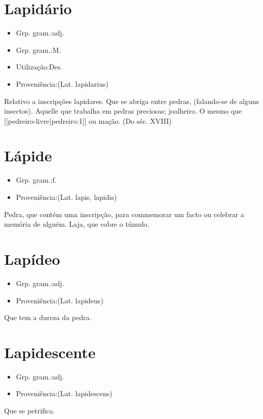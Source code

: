\section{Lapidário}
\begin{itemize}
\item {Grp. gram.:adj.}
\end{itemize}
\begin{itemize}
\item {Grp. gram.:M.}
\end{itemize}
\begin{itemize}
\item {Utilização:Des.}
\end{itemize}
\begin{itemize}
\item {Proveniência:(Lat. \textunderscore lapidarius\textunderscore )}
\end{itemize}
Relativo a inscripções lapidares.
Que se abriga entre pedras, (falando-se de alguns insectos).
Aquelle que trabalha em pedras preciosas; joalheiro.
O mesmo que [[pedreiro-livre|pedreiro:1]] ou \textunderscore mação\textunderscore . (Do séc. XVIII)
\section{Lápide}
\begin{itemize}
\item {Grp. gram.:f.}
\end{itemize}
\begin{itemize}
\item {Proveniência:(Lat. \textunderscore lapis\textunderscore , \textunderscore lapidis\textunderscore )}
\end{itemize}
Pedra, que contém uma inscripção, para commemorar um facto ou celebrar a memória de alguém.
Laja, que cobre o túmulo.
\section{Lapídeo}
\begin{itemize}
\item {Grp. gram.:adj.}
\end{itemize}
\begin{itemize}
\item {Proveniência:(Lat. \textunderscore lapideus\textunderscore )}
\end{itemize}
Que tem a dureza da pedra.
\section{Lapidescente}
\begin{itemize}
\item {Grp. gram.:adj.}
\end{itemize}
\begin{itemize}
\item {Proveniência:(Lat. \textunderscore lapidescens\textunderscore )}
\end{itemize}
Que se petrifica.
